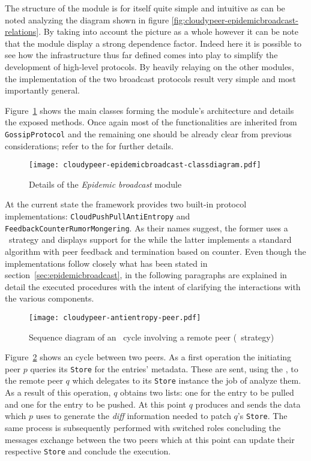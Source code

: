 The structure of the module is for itself quite simple and intuitive as
can be noted analyzing the diagram shown in figure
\ref{fig:cloudypeer-epidemicbroadcast-relations}. By taking into
account the picture as a whole however it can be note that the module
display a strong dependence factor. Indeed here it is possible to see how
the \api infrastructure thus far defined comes into play to simplify
the development of high-level protocols. By heavily relaying on the
other modules, the implementation of the two \epidemic broadcast
protocols result very simple and most importantly general.

Figure~\ref{fig:cloudypeer-epidemicbroadcast-class} shows the main
classes forming the module's architecture and details the exposed
methods. Once again most of the functionalities are inherited from
\texttt{GossipProtocol} and the remaining one should be already clear
from previous considerations; refer to the \javadoc for further details.

\begin{figure}[h]
  \hspace{-50pt}
  \texttt{[image: cloudypeer-epidemicbroadcast-classdiagram.pdf]}
  \caption{Details of the \textit{Epidemic broadcast} module \api}
  \label{fig:cloudypeer-epidemicbroadcast-class}
\end{figure}

At the current state the framework provides two built-in protocol
implementations: \texttt{CloudPushPullAntiEntropy} and
\texttt{FeedbackCounterRumorMongering}. As their names suggest, the
former uses a \PUSHPULL\ strategy and displays support for the \cloud while
the latter implements a standard \rumormongering algorithm with peer
feedback and termination based on counter.
Even though the implementations follow closely what has been stated in
section~\ref{sec:epidemicbroadcast}, in the following paragraphs are
explained in detail the executed procedures with the intent of
clarifying the interactions with the various \cloudypeer components.

\begin{figure}[h]
  \centering
  \texttt{[image: cloudypeer-antientropy-peer.pdf]}
  \caption{Sequence diagram of an \antientropy\ cycle involving a remote
    peer (\PUSHPULL\ strategy)}
  \label{fig:cloudypeer-sequence-antientropy-peer}
\end{figure}

Figure~\ref{fig:cloudypeer-sequence-antientropy-peer} shows an
\antientropy cycle between two peers. As a first operation the
initiating peer $p$ queries its \texttt{Store} for the entries'
metadata. These are sent, using the \networkhelper, to the remote
peer $q$ which delegates to its \texttt{Store} instance the job of
analyze them. As a result of this operation, $q$ obtains two lists:
one for the entry to be pulled and one for the entry to be pushed.
At this point $q$ produces and sends the data which  $p$ uses to generate
the \textit{diff} information needed to patch $q$'s \texttt{Store}. The
same process is subsequently performed with switched roles concluding
the messages exchange between the two peers which at this point can
update their respective \texttt{Store} and conclude the execution.

